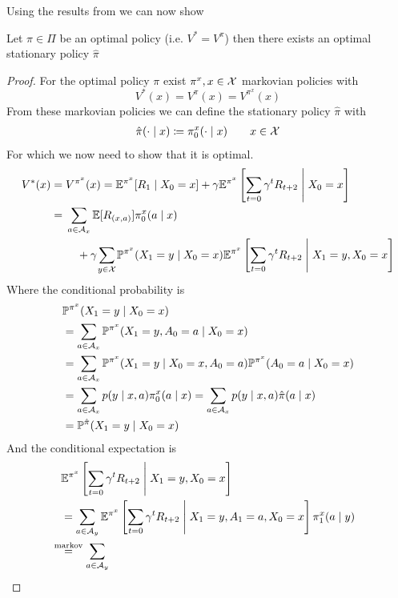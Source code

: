 Using the results from \citeauthor{putermanMarkovDecisionProcesses2005} we can now show
\begin{thm}\label{optimal policy => opt stat policy}
	Let \(\pi\in\Pi\) be an optimal policy (i.e. \(V^*=V^\pi\)) then there exists an optimal stationary policy \(\hat{\pi}\)
\end{thm}
\begin{proof}
	For the optimal policy \(\pi\) exist \(\pi^x,x\in\mathcal{X}\) markovian policies with
	\[
		V^*(x)=V^\pi(x)=V^{\pi^x}(x)
	\]
	From these markovian policies we can define the stationary policy \(\hat{\pi}\) with
	\begin{align}
		\hat{\pi}(\cdot\mid x)\coloneqq \pi_0^x(\cdot\mid x) \qquad x\in\mathcal{X}
	\end{align}
	For which we now need to show that it is optimal.
	\begin{align}
		V^*(x)&=V^{\pi^x}(x)=\E^{\pi^x}[R_1\mid X_0=x] 
		+ \gamma \E^{\pi^x}\left[\sum_{t=0}\gamma^t R_{t+2}\;\middle|\; X_0=x \right] \nonumber\\
		&=\begin{aligned}[t]
			&\sum_{a\in\cA_x}\E[R_{(x,a)}]\pi_0^x(a\mid x)\\
			&\quad + \gamma \smashoperator{\sum_{y\in\cX}}\Pr^{\pi^x}(X_1=y\mid X_0=x)
			\E^{\pi^x}\left[\sum_{t=0}\gamma^t R_{t+2}\;\middle|\; X_1=y, X_0=x\right]\label{V^pi^x expanded}
		\end{aligned}
	\end{align}
	Where the conditional probability is
	\begin{align}
		&\mathbb{P}^{\pi^x}(X_1=y\mid X_0=x) \nonumber \\
		&=\sum_{a\in\mathcal{A}_x} \mathbb{P}^{\pi^x}(X_1=y, A_0=a \mid X_0=x) \nonumber\\
		&=\sum_{a\in\mathcal{A}_x} \mathbb{P}^{\pi^x}(X_1=y\mid X_0=x, A_0=a) \mathbb{P}^{\pi^x}(A_0=a\mid X_0=x)\nonumber\\
		&=\sum_{a\in\mathcal{A}_x} p(y\mid x,a) \pi^x_0(a\mid x)
		=\sum_{a\in\mathcal{A}_x} p(y\mid x,a) \hat{\pi}(a\mid x) \nonumber\\
		&=\mathbb{P}^{\hat{\pi}}(X_1=y\mid X_0=x)
	\end{align}
	And the conditional expectation is
	\begin{align}
		&\E^{\pi^x}\left[\sum_{t=0}\gamma^t R_{t+2}\;\middle|\; X_1=y, X_0=x\right]\nonumber\\
		&=\sum_{a\in\cA_y}
		\E^{\pi^x}\left[\sum_{t=0}\gamma^t R_{t+2}\;\middle|\; X_1=y, A_1=a, X_0=x\right]\pi^x_1(a\mid y)\nonumber\\
		&\lxeq{\text{markov}} \sum_{a\in\cA_y}

\end{align}
\end{proof}
